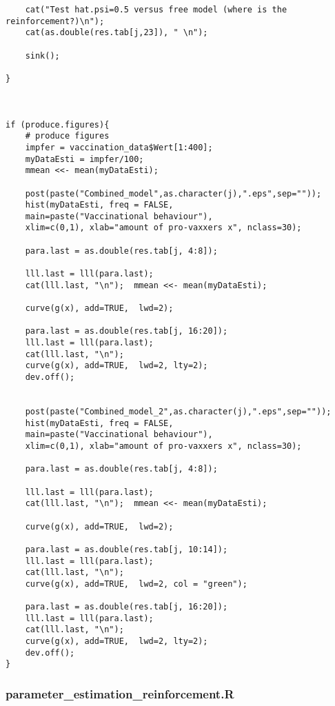 \begin{lstlisting}
	cat("Test hat.psi=0.5 versus free model (where is the reinforcement?)\n");
	cat(as.double(res.tab[j,23]), " \n");
	
	sink();

}



if (produce.figures){
	# produce figures
	impfer = vaccination_data$Wert[1:400];
	myDataEsti = impfer/100;       
	mmean <<- mean(myDataEsti);
	
	post(paste("Combined_model",as.character(j),".eps",sep=""));
	hist(myDataEsti, freq = FALSE, 
	main=paste("Vaccinational behaviour"),
	xlim=c(0,1), xlab="amount of pro-vaxxers x", nclass=30);
	
	para.last = as.double(res.tab[j, 4:8]);
	
	lll.last = lll(para.last);
	cat(lll.last, "\n");  mmean <<- mean(myDataEsti);
	
	curve(g(x), add=TRUE,  lwd=2);
	
	para.last = as.double(res.tab[j, 16:20]);
	lll.last = lll(para.last);
	cat(lll.last, "\n");
	curve(g(x), add=TRUE,  lwd=2, lty=2);
	dev.off();
	
	
	post(paste("Combined_model_2",as.character(j),".eps",sep=""));
	hist(myDataEsti, freq = FALSE, 
	main=paste("Vaccinational behaviour"),
	xlim=c(0,1), xlab="amount of pro-vaxxers x", nclass=30);
	
	para.last = as.double(res.tab[j, 4:8]);
	
	lll.last = lll(para.last);
	cat(lll.last, "\n");  mmean <<- mean(myDataEsti);
	
	curve(g(x), add=TRUE,  lwd=2);
	
	para.last = as.double(res.tab[j, 10:14]);
	lll.last = lll(para.last);
	cat(lll.last, "\n");
	curve(g(x), add=TRUE,  lwd=2, col = "green");
	
	para.last = as.double(res.tab[j, 16:20]);
	lll.last = lll(para.last);
	cat(lll.last, "\n");
	curve(g(x), add=TRUE,  lwd=2, lty=2);
	dev.off();
}
\end{lstlisting}

\subsubsection{parameter\_estimation\_reinforcement.R}

